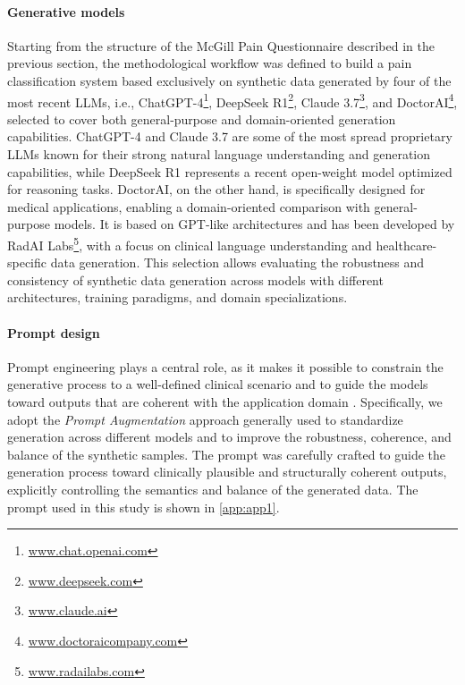 \documentclass[preprint,12pt,authoryear]{elsarticle}
\begin{document}
\paragraph{Generative models} Starting from the structure of the McGill Pain Questionnaire described in the previous section, the methodological workflow was defined to build a pain classification system based exclusively on synthetic data generated by four of the most recent LLMs, i.e., ChatGPT-4\footnote{\href{https://chat.openai.com/}{www.chat.openai.com}}, DeepSeek R1\footnote{\href{https://www.deepseek.com/en/}{www.deepseek.com}}, Claude 3.7\footnote{\href{https://claude.ai/}{www.claude.ai}}, and DoctorAI\footnote{\href{https://www.doctoraicompany.com/}{www.doctoraicompany.com}}, selected to cover both general-purpose and domain-oriented generation capabilities. 
ChatGPT-4 and Claude 3.7 are some of the most spread proprietary LLMs known for their strong natural language understanding and generation capabilities, while DeepSeek R1 represents a recent open-weight model optimized for reasoning tasks. DoctorAI, on the other hand, is specifically designed for medical applications, enabling a domain-oriented comparison with general-purpose models. It is based on GPT-like architectures and has been developed by RadAI Labs\footnote{\href{https://radailabs.com/}{www.radailabs.com}}, with a focus on clinical language understanding and healthcare-specific data generation. This selection allows evaluating the robustness and consistency of synthetic data generation across models with different architectures, training paradigms, and domain specializations.

\paragraph{Prompt design} 
Prompt engineering plays a central role, as it makes it possible to constrain the generative process to a well-defined clinical scenario and to guide the models toward outputs that are coherent with the application domain \citep{liu2023pre}. Specifically, we adopt the \textit{Prompt Augmentation} approach \citep{wang2022promda} generally used to standardize generation across different models and to improve the robustness, coherence, and balance of the synthetic samples. The prompt was carefully crafted to guide the generation process toward clinically plausible and structurally coherent outputs, explicitly controlling the semantics and balance of the generated data. The prompt used in this study is shown in \ref{app:app1}.%
\end{document}
